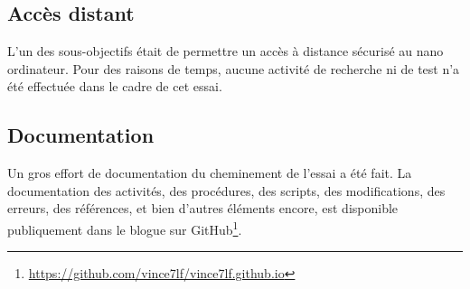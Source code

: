 \subsection{Accès distant}
\par L'un des sous-objectifs était de permettre un accès à distance sécurisé au nano ordinateur. Pour des raisons de temps, aucune activité de recherche ni de test n'a été effectuée dans le cadre de cet essai. 
\subsection{Documentation}
\par Un gros effort de documentation du cheminement de l'essai a été fait. La documentation des activités, des procédures, des scripts, des modifications, des erreurs, des références, et bien d'autres éléments encore, est disponible publiquement dans le blogue sur GitHub\footnote{\url{https://github.com/vince7lf/vince7lf.github.io}}.